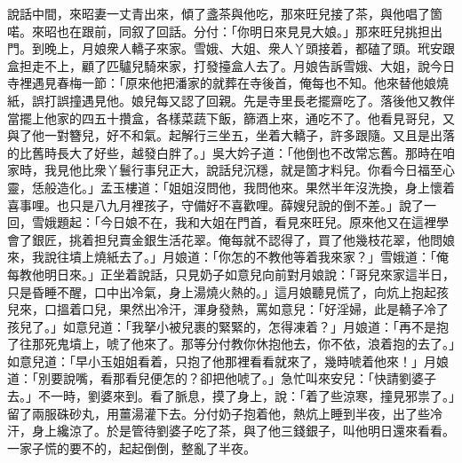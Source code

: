 說話中間，來昭妻一丈青出來，傾了盞茶與他吃，那來旺兒接了茶，與他唱了箇喏。來昭也在跟前，同叙了回話。分付：「你明日來見見大娘。」那來旺兒挑担出門。到晚上，月娘衆人轎子來家。雪娥、大姐、衆人丫頭接着，都磕了頭。玳安跟盒担走不上，顧了匹驢兒騎來家，打發擡盒人去了。月娘告訴雪娥、大姐，說今日寺裡遇見春梅一節：「原來他把潘家的就葬在寺後首，俺每也不知。他來替他娘燒紙，誤打誤撞遇見他。娘兒每又認了回親。先是寺里長老擺齋吃了。落後他又教伴當擺上他家的四五十攢盒，各樣菜蔬下飯，篩酒上來，通吃不了。他看見哥兒，又與了他一對簪兒，好不和氣。起解行三坐五，坐着大轎子，許多跟隨。又且是出落的比舊時長大了好些，越發白胖了。」{}吳大妗子道：「他倒也不改常忘舊。那時在咱家時，我見他比衆丫鬟行事兒正大，說話兒沉穩，就是箇才料兒。你看今日福至心靈，恁般造化。」{}孟玉樓道：「姐姐沒問他，我問他來。果然半年沒洗換，身上懷着喜事哩。也只是八九月裡孩子，守備好不喜歡哩。薛嫂兒說的倒不差。」說了一回，雪娥題起：「今日娘不在，我和大姐在門首，看見來旺兒。原來他又在這裡學會了銀匠，挑着担兒賣金銀生活花翠。俺每就不認得了，買了他幾枝花翠，他問娘來，我說往墳上燒紙去了。」月娘道：「你怎的不教他等着我來家？」雪娥道：「俺每教他明日來。」正坐着說話，只見奶子如意兒向前對月娘說：「哥兒來家這半日，只是昏睡不醒，口中出冷氣，身上湯燒火熱的。」這月娘聽見慌了，向炕上抱起孩兒來，口搵着口兒，果然出冷汗，渾身發熱，罵如意兒：「好淫婦，此是轎子冷了孩兒了。」如意兒道：「我拏小被兒裹的緊緊的，怎得凍着？」月娘道：「再不是抱了往那死鬼墳上，唬了他來了。那等分付教你休抱他去，你不依，浪着抱的去了。」如意兒道：「早小玉姐姐看着，只抱了他那裡看看就來了，幾時唬着他來！」月娘道：「別要說嘴，看那看兒便怎的？卻把他唬了。」急忙叫來安兒：「快請劉婆子去。」不一時，劉婆來到。看了脈息，摸了身上，說：「着了些涼寒，撞見邪祟了。」{}留了兩服硃砂丸，用薑湯灌下去。分付奶子抱着他，熱炕上睡到半夜，出了些冷汗，身上纔涼了。於是管待劉婆子吃了茶，與了他三錢銀子，叫他明日還來看看。一家子慌的要不的，起起倒倒，整亂了半夜。

